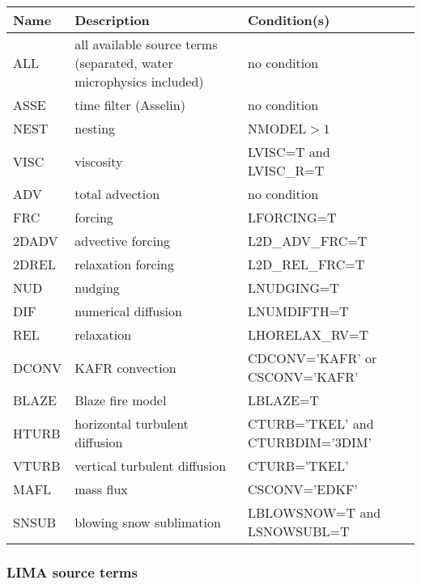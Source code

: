 \begin{longtable} {|p{}|p{}|p{}|}
\hline
Name & Description & Condition(s) \\
\hline \hline
\endhead
ALL    & all available source terms (separated,  water microphysics included) & no condition \\\hline \hline
ASSE   & time filter (Asselin)          & no condition                     \\\hline
NEST   & nesting                        & NMODEL$>1$                       \\\hline
VISC   & viscosity                      & LVISC=T and LVISC\_R=T           \\\hline
ADV    & total advection                & no condition                     \\\hline
FRC    & forcing                        & LFORCING=T                       \\\hline
2DADV  & advective forcing              & L2D\_ADV\_FRC=T                  \\\hline
2DREL  & relaxation forcing             & L2D\_REL\_FRC=T                  \\\hline
NUD    & nudging                        & LNUDGING=T                       \\\hline
DIF    & numerical diffusion            & LNUMDIFTH=T                      \\\hline
REL    & relaxation                     & LHORELAX\_RV=T                   \\\hline
DCONV  & KAFR convection                & CDCONV='KAFR' or CSCONV='KAFR'   \\\hline
BLAZE  & Blaze fire model               & LBLAZE=T                         \\\hline
HTURB  & horizontal turbulent diffusion & CTURB='TKEL' and CTURBDIM='3DIM' \\\hline
VTURB  & vertical turbulent diffusion   & CTURB='TKEL'                     \\\hline
MAFL   & mass flux                      & CSCONV='EDKF'                    \\\hline
SNSUB  & blowing snow sublimation       & LBLOWSNOW=T and LSNOWSUBL=T      \\\hline
\end{longtable}

\subsubsection{LIMA source terms}

